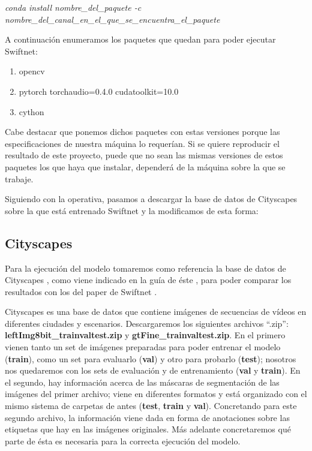 \begin{center}
\textit{conda install nombre\_del\_paquete -c nombre\_del\_canal\_en\_el\_que\_se\_encuentra\_el\_paquete}
\end{center}

A continuación enumeramos los paquetes que quedan para poder ejecutar Swiftnet:

\begin{enumerate}
\item opencv \cite{opencv}
\item pytorch torchaudio=0.4.0 cudatoolkit=10.0 \cite{pytorch}
\item cython
\end{enumerate}

Cabe destacar que ponemos dichos paquetes con estas versiones porque las especificaciones de nuestra máquina lo requerían. Si se quiere reproducir el resultado de este proyecto, puede que no sean las mismas versiones de estos paquetes los que haya que instalar, dependerá de la máquina sobre la que se trabaje.

Siguiendo con la operativa, pasamos a descargar la base de datos de Cityscapes sobre la que está entrenado Swiftnet y la modificamos de esta forma:


\subsection{Cityscapes}

Para la ejecución del modelo tomaremos como referencia la base de datos de Cityscapes \cite{cityscapes}, como viene indicado en la guía de éste \cite{github_swiftnet}, para poder comparar los resultados con los del paper de Swiftnet \cite{swiftnet}.

Cityscapes es una base de datos que contiene imágenes de secuencias de vídeos en diferentes ciudades y escenarios. Descargaremos los siguientes archivos ``.zip'': \textbf{leftImg8bit\_trainvaltest.zip} y \textbf{gtFine\_trainvaltest.zip}. En el primero vienen tanto un set de imágenes preparadas para poder entrenar el modelo (\textbf{train}), como un set para evaluarlo (\textbf{val}) y otro para probarlo (\textbf{test}); nosotros nos quedaremos con los sets de evaluación y de entrenamiento (\textbf{val} y \textbf{train}). En el segundo, hay información acerca de las máscaras de segmentación de las imágenes del primer archivo; viene en diferentes formatos y está organizado con el mismo sistema de carpetas de antes (\textbf{test}, \textbf{train} y \textbf{val}). Concretando para este segundo archivo, la información viene dada en forma de anotaciones sobre las etiquetas que hay en las imágenes originales. Más adelante concretaremos qué parte de ésta es necesaria para la correcta ejecución del modelo.

